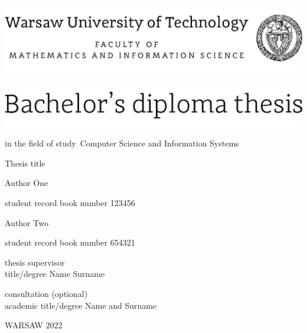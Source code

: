 \documentclass[12pt,twoside,a4paper]{article}
\newcommand{\discipline}{Computer Science and Information Systems}
\renewcommand{\title}{Thesis title}
\newcommand{\supervisor}{title/degree Name Surname}
\renewcommand{\year}{2022}
\newcommand{\authori}{Author One}
\newcommand{\albumi}{123456}
\newcommand{\authorii}{Author Two}
\newcommand{\albumii}{654321}
\begin{document}
\pagestyle{empty}


\begin{center}
\includegraphics[scale=1.]{img/wut}
\vspace{40pt}


\includegraphics[scale=1.]{img/bachelor} %

{ \arial
in the field of study~\discipline 

\vspace{30pt}
{\arial \large \title}


\vspace{40pt}

{\arial \huge \authori }

\vspace{5pt}

student record book number \albumi

\vspace {20pt}
{\arial \huge \authorii}

\vspace{5pt}

student record book number \albumii

\vspace{40pt}

thesis supervisor \\
{\arial \supervisor}

\vspace{15pt}
 
consultation (optional)  \\
{\arial academic title/degree Name and Surname}

\vfill
 
WARSAW \year \\
}
\end{center}


%
%
\end{document}
